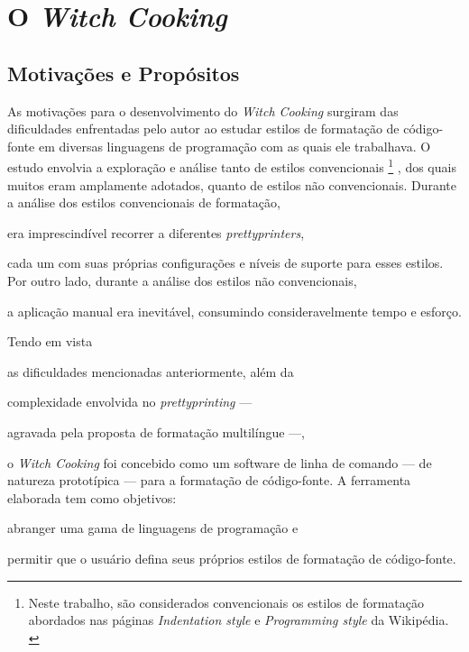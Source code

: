 \documentclass
  [11pt,a4paper,english,brazil,openright,sumario=tradicional,twoside]
  {abntex2}
\newcommand{\witchcooking}{\textit{Witch Cooking}\xspace}
\begin{document}

  \chapter{O \witchcooking}


  \section{Motivações e Propósitos}

  As motivações para o desenvolvimento do \witchcooking surgiram das
  dificuldades enfrentadas pelo autor ao estudar estilos de formatação de
  código-fonte em diversas linguagens de programação com as quais ele
  trabalhava. O estudo envolvia a exploração e análise tanto de estilos
  convencionais%
  \footnote
    { Neste trabalho, são considerados convencionais os estilos de formatação
      abordados nas páginas \textit{Indentation style} e
      \textit{Programming style} da Wikipédia.
      \cites{wiki-2023-indentation}{wiki-2023-programming}}%
  , dos quais muitos eram amplamente adotados, quanto de estilos
  não convencionais. Durante a análise dos estilos convencionais de formatação,
  \begin{inparaenum}
    \item era imprescindível recorrer a diferentes \textit{prettyprinters},
    \item cada um com suas próprias configurações e níveis de suporte para
          esses estilos. Por outro lado, durante a análise dos estilos
          não convencionais,
    \item a aplicação manual era inevitável, consumindo consideravelmente tempo
          e esforço.
  \end{inparaenum}

  Tendo em vista
  \begin{inparaenum}
    \item as dificuldades mencionadas anteriormente, além da
    \item complexidade envolvida no \textit{prettyprinting} ---
    \item agravada pela proposta de formatação multilíngue ---,
  \end{inparaenum}
  o \witchcooking foi concebido como um software de linha de comando --- de
  natureza prototípica --- para a formatação de código-fonte. A ferramenta
  elaborada tem como objetivos:
  \begin{inparaenum}
    \item abranger uma gama de linguagens de programação e
    \item permitir que o usuário defina seus próprios estilos de formatação
          de código-fonte.
  \end{inparaenum}
\end{document}
